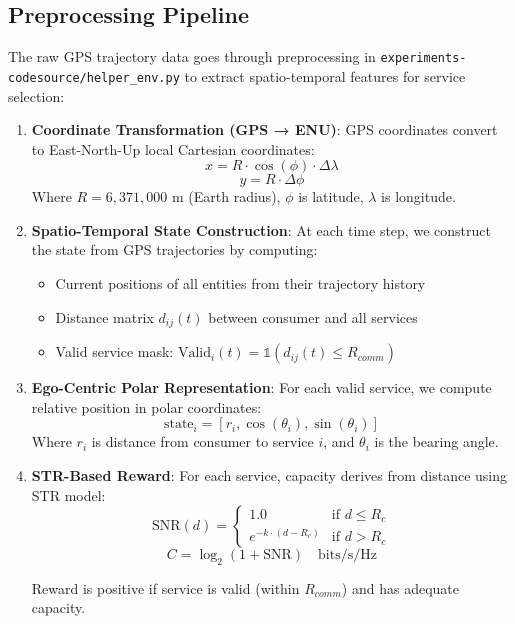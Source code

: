 \documentclass[10pt,twocolumn]{article}
\providecommand{\tightlist}{\setlength{\itemsep}{0pt}\setlength{\parskip}{0pt}}
\begin{document}
\subsection{Preprocessing Pipeline}\label{preprocessing-pipeline}

The raw GPS trajectory data goes through preprocessing in
\texttt{experiments-codesource/helper\_env.py} to extract
spatio-temporal features for service selection:

\begin{enumerate}
	\def\labelenumi{\arabic{enumi}.}
	\item
	      \textbf{Coordinate Transformation (GPS → ENU)}: GPS coordinates
	      convert to East-North-Up local Cartesian coordinates:
	      \[x = R \cdot \cos(\phi) \cdot \Delta\lambda\]
	      \[y = R \cdot \Delta\phi\] Where \(R = 6,371,000\) m (Earth radius),
	      \(\phi\) is latitude, \(\lambda\) is longitude.
	\item
	      \textbf{Spatio-Temporal State Construction}: At each time step, we
	      construct the state from GPS trajectories by computing:

	      \begin{itemize}
		      \tightlist
		      \item
		            Current positions of all entities from their trajectory history
		      \item
		            Distance matrix \(d_{ij}(t)\) between consumer and all services
		      \item
		            Valid service mask:
		            \(\text{Valid}_i(t) = \mathbb{1}(d_{ij}(t) \leq R_{comm})\)
	      \end{itemize}
	\item
	      \textbf{Ego-Centric Polar Representation}: For each valid service, we
	      compute relative position in polar coordinates:
	      \[\text{state}_i = [r_i, \cos(\theta_i), \sin(\theta_i)]\] Where
	      \(r_i\) is distance from consumer to service \(i\), and \(\theta_i\)
	      is the bearing angle.
	\item
	      \textbf{STR-Based Reward}: For each service, capacity derives from
	      distance using STR model:
	      \[\text{SNR}(d) = \begin{cases} 1.0 & \text{if } d \leq R_c \\ e^{-k \cdot (d-R_c)} & \text{if } d > R_c \end{cases}\]
	      \[C = \log_2(1 + \text{SNR}) \quad \text{bits/s/Hz}\]

	      Reward is positive if service is valid (within \(R_{comm}\)) and has
	      adequate capacity.
\end{enumerate}
\end{document}
